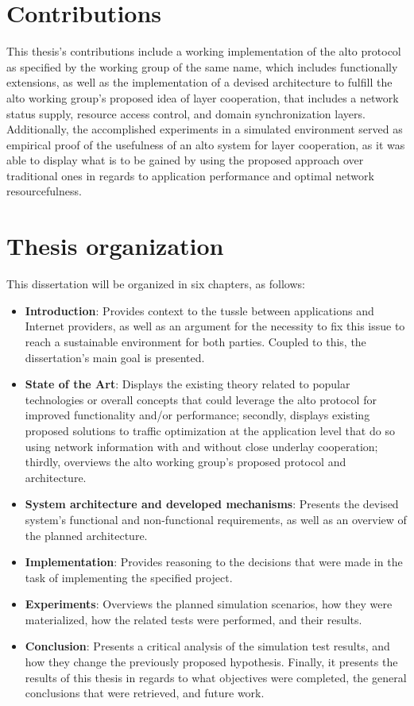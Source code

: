\section{Contributions}

    This thesis's contributions include a working implementation of the \gls{alto} protocol as specified by the working group of the same name, which includes functionally extensions, as well as the implementation of a devised architecture to fulfill the \gls{alto} working group's proposed idea of layer cooperation, that includes a network status supply, resource access control, and domain synchronization layers.
    Additionally, the accomplished experiments in a simulated environment served as empirical proof of the usefulness of an \gls{alto} system for layer cooperation, as it was able to display what is to be gained by using the proposed approach over traditional ones in regards to application performance and optimal network resourcefulness.

\section{Thesis organization}

    This dissertation will be organized in six chapters, as follows:

\begin{itemize}
    \item \textbf{Introduction}: Provides context to the tussle between applications and Internet providers, as well as an argument for the necessity to fix this issue to reach a sustainable environment for both parties. Coupled to this, the dissertation's main goal is presented.
    \item \textbf{State of the Art}: Displays the existing theory related to popular technologies or overall concepts that could leverage the \gls{alto} protocol for improved functionality and/or performance; secondly, displays existing proposed solutions to traffic optimization at the application level that do so using network information with and without close underlay cooperation; thirdly, overviews the \gls{alto} working group's proposed protocol and architecture.
    \item \textbf{System architecture and developed mechanisms}: Presents the devised system's functional and non-functional requirements, as well as an overview of the planned architecture.
    \item \textbf{Implementation}: Provides reasoning to the decisions that were made in the task of implementing the specified project.
    \item \textbf{Experiments}: Overviews the planned simulation scenarios, how they were materialized, how the related tests were performed, and their results.
    \item \textbf{Conclusion}: Presents a critical analysis of the simulation test results, and how they change the previously proposed hypothesis. Finally, it presents the results of this thesis in regards to what objectives were completed, the general conclusions that were retrieved, and future work.
\end{itemize}{}

